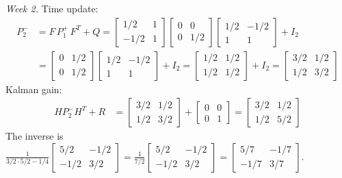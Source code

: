 \documentclass[12pt]{article}
\begin{document}
\begin{stepbox}
\textit{Week 2.} Time update:
\begin{align}
P_2^- &= F\,P_1^+\,F^T + Q = \begin{bmatrix} 1/2 & 1 \\ -1/2 & 1 \end{bmatrix}\begin{bmatrix} 0 & 0 \\ 0 & 1/2 \end{bmatrix}\begin{bmatrix} 1/2 & -1/2 \\ 1 & 1 \end{bmatrix} + I_2 \nonumber \\
&= \begin{bmatrix} 0 & 1/2 \\ 0 & 1/2 \end{bmatrix}\begin{bmatrix} 1/2 & -1/2 \\ 1 & 1 \end{bmatrix} + I_2 = \begin{bmatrix} 1/2 & 1/2 \\ 1/2 & 1/2 \end{bmatrix} + I_2 = \begin{bmatrix} 3/2 & 1/2 \\ 1/2 & 3/2 \end{bmatrix}
\end{align}
Kalman gain:
\begin{align}
H P_2^- H^T + R &= \begin{bmatrix} 3/2 & 1/2 \\ 1/2 & 3/2 \end{bmatrix} + \begin{bmatrix} 0 & 0 \\ 0 & 1 \end{bmatrix} = \begin{bmatrix} 3/2 & 1/2 \\ 1/2 & 5/2 \end{bmatrix}
\end{align}
The inverse is $\frac{1}{3/2 \cdot 5/2 - 1/4}\begin{bmatrix} 5/2 & -1/2 \\ -1/2 & 3/2 \end{bmatrix} = \frac{1}{7/2}\begin{bmatrix} 5/2 & -1/2 \\ -1/2 & 3/2 \end{bmatrix} = \begin{bmatrix} 5/7 & -1/7 \\ -1/7 & 3/7 \end{bmatrix}$.

\end{stepbox}
\end{document}
